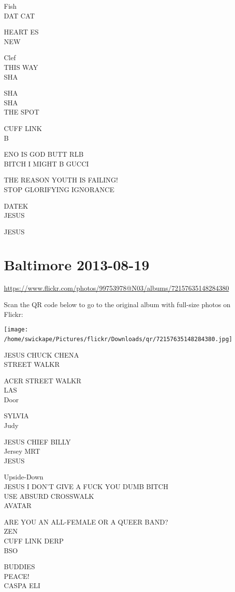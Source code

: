 \documentclass[10pt,letterpaper]{article}
\begin{document}
Fish\\
DAT CAT

HEART ES\\
NEW

Clef\\
THIS WAY\\
SHA

SHA\\
SHA\\
THE SPOT

CUFF LINK\\
B

ENO IS GOD BUTT RLB\\
BITCH I MIGHT B GUCCI

THE REASON YOUTH IS FAILING!\\
STOP GLORIFYING IGNORANCE

DATEK\\
JESUS

JESUS
\

\section*{Baltimore 2013-08-19}

\url{https://www.flickr.com/photos/99753978@N03/albums/72157635148284380}

Scan the QR code below to go to the original album with full-size photos on Flickr:

\texttt{[image: /home/swickape/Pictures/flickr/Downloads/qr/72157635148284380.jpg]}
\

JESUS CHUCK CHENA\\
STREET WALKR

ACER STREET WALKR\\
LAS\\
Door

SYLVIA\\
Judy

JESUS CHIEF BILLY\\
Jersey MRT\\
JESUS

Upside{-}Down\\
JESUS I DON'T GIVE A FUCK YOU DUMB BITCH\\
USE ABSURD CROSSWALK\\
AVATAR

ARE YOU AN ALL{-}FEMALE OR A QUEER BAND?\\
ZEN\\
CUFF LINK DERP\\
BSO

BUDDIES\\
PEACE!\\
CASPA ELI
\end{document}
